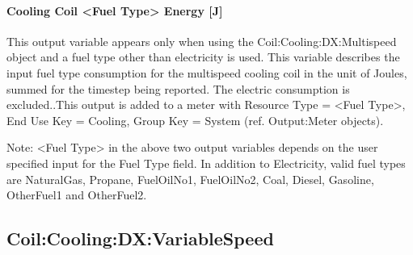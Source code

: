 \paragraph{Cooling Coil \textless{}Fuel Type\textgreater{} Energy {[}J{]}}\label{cooling-coil-fuel-type-energy-j}

This output variable appears only when using the Coil:Cooling:DX:Multispeed object and a fuel type other than electricity is used. This variable describes the input fuel type consumption for the multispeed cooling coil in the unit of Joules, summed for the timestep being reported. The electric consumption is excluded..This output is added to a meter with Resource Type = \textless{}Fuel Type\textgreater{}, End Use Key = Cooling, Group Key = System (ref. Output:Meter objects).

Note: \textless{}Fuel Type\textgreater{} in the above two output variables depends on the user specified input for the Fuel Type field. In addition to Electricity, valid fuel types are NaturalGas, Propane, FuelOilNo1, FuelOilNo2, Coal, Diesel, Gasoline, OtherFuel1 and OtherFuel2.

\subsection{Coil:Cooling:DX:VariableSpeed}\label{coilcoolingdxvariablespeed}

